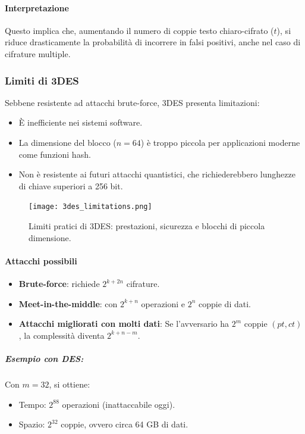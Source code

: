 \documentclass{report}
\begin{document}
\paragraph{Interpretazione}

Questo implica che, aumentando il numero di coppie testo chiaro-cifrato ($t$), si riduce drasticamente la probabilità di incorrere in falsi positivi, anche nel caso di cifrature multiple.

\subsubsection{Limiti di 3DES}

Sebbene resistente ad attacchi brute-force, 3DES presenta limitazioni:
\begin{itemize}
    \item È inefficiente nei sistemi software.
    \item La dimensione del blocco ($n = 64$) è troppo piccola per applicazioni moderne come funzioni hash.
    \item Non è resistente ai futuri attacchi quantistici, che richiederebbero lunghezze di chiave superiori a 256 bit.
\end{itemize}

\begin{figure}[h]
    \centering
    \texttt{[image: 3des\_limitations.png]}
    \caption{Limiti pratici di 3DES: prestazioni, sicurezza e blocchi di piccola dimensione.}
\end{figure}

\paragraph{Attacchi possibili}

\begin{itemize}
    \item \textbf{Brute-force}: richiede $2^{k + 2n}$ cifrature.
    \item \textbf{Meet-in-the-middle}: con $2^{k + n}$ operazioni e $2^n$ coppie di dati.
    \item \textbf{Attacchi migliorati con molti dati}: Se l'avversario ha $2^m$ coppie $(pt, ct)$, la complessità diventa $2^{k+n-m}$.
\end{itemize}

\subparagraph{Esempio con DES:}

Con $m = 32$, si ottiene:
\begin{itemize}
    \item Tempo: $2^{88}$ operazioni (inattaccabile oggi).
    \item Spazio: $2^{32}$ coppie, ovvero circa 64 GB di dati.
\end{itemize}


  
\end{document}

